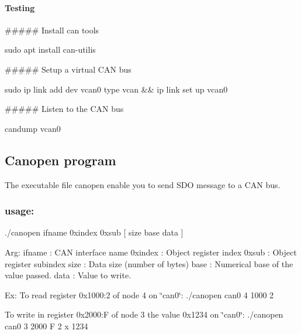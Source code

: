 \paragraph*{Testing}

\#\#\#\#\# Install can tools 
\begin{DoxyCode}
sudo apt install can-utilis
\end{DoxyCode}


\#\#\#\#\# Setup a virtual C\+AN bus 
\begin{DoxyCode}
sudo ip link add dev vcan0 type vcan && ip link set up vcan0
\end{DoxyCode}


\#\#\#\#\# Listen to the C\+AN bus 
\begin{DoxyCode}
candump vcan0
\end{DoxyCode}


\subsection*{Canopen program}

The executable file canopen enable you to send S\+DO message to a C\+AN bus. \subsubsection*{usage\+:}

./canopen ifname 0xindex 0xsub \mbox{[} size base data \mbox{]}

Arg\+: ifname \+: C\+AN interface name 0xindex \+: Object register index 0xsub \+: Object register subindex size \+: Data size (number of bytes) base \+: Numerical base of the value passed. data \+: Value to write.

Ex\+: To read register 0x1000\+:2 of node 4 on \char`\"{}can0\char`\"{}\+: ./canopen can0 4 1000 2

To write in register 0x2000\+:F of node 3 the value 0x1234 on \char`\"{}can0\char`\"{}\+: ./canopen can0 3 2000 F 2 x 1234 